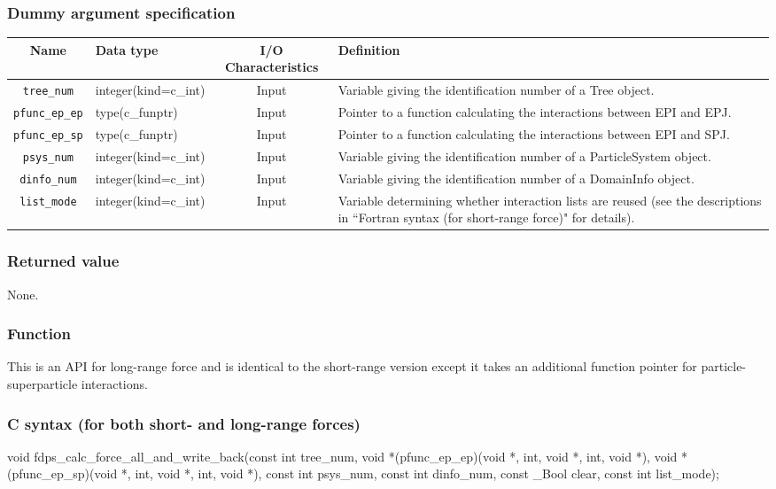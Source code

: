 \subsubsection*{Dummy argument specification}
\begin{table}[h]
\begin{tabularx}{\linewidth}{clcX}
\toprule
\rowcolor{Snow2}
Name & Data type & I/O Characteristics & Definition \\
\midrule
\verb|tree_num|    & integer(kind=c\_int)   & Input     & Variable giving the identification number of a Tree object. \\
\verb|pfunc_ep_ep| & type(c\_funptr)        & Input     & Pointer to a function calculating the interactions between EPI and EPJ. \\
\verb|pfunc_ep_sp| & type(c\_funptr)        & Input     & Pointer to a function calculating the interactions between EPI and SPJ. \\
\verb|psys_num|    & integer(kind=c\_int)   & Input     & Variable giving the identification number of a ParticleSystem object. \\
\verb|dinfo_num|   & integer(kind=c\_int)   & Input     & Variable giving the identification number of a DomainInfo object. \\
\verb|list_mode|   & integer(kind=c\_int)   & Input     & Variable determining whether interaction lists are reused (see the descriptions in ``Fortran syntax (for short-range force)" for details).\\
\bottomrule
\end{tabularx}
\end{table}


\subsubsection*{Returned value}
None.


\subsubsection*{Function}
This is an API for long-range force and is identical to the short-range version except it takes an additional function pointer for particle-superparticle interactions.
\clearpage


\subsubsection*{C syntax (for both short- and long-range forces)}
\begin{screen}
\begin{spverbatim}
void fdps_calc_force_all_and_write_back(const int tree_num,
                                        void *(pfunc_ep_ep)(void *, int, void *, int, void *),
                                        void *(pfunc_ep_sp)(void *, int, void *, int, void *),
                                        const int psys_num,
                                        const int dinfo_num,
                                        const _Bool clear,
                                        const int list_mode);
\end{spverbatim}
\end{screen}

